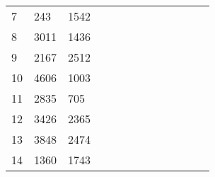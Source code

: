 \begin{table}[tb]
\begin{tabular}{|l|l|l|llllllllll}
		7  & 243  & 1542 &                           &                           &                           &                           &                           &                           &                           &                           &                           &                           \\ \cline{1-3}
		8  & 3011 & 1436 &                           &                           &                           &                           &                           &                           &                           &                           &                           &                           \\ \cline{1-3}
		9  & 2167 & 2512 &                           &                           &                           &                           &                           &                           &                           &                           &                           &                           \\ \cline{1-3}
		10 & 4606 & 1003 &                           &                           &                           &                           &                           &                           &                           &                           &                           &                           \\ \cline{1-3}
		11 & 2835 & 705  &                           &                           &                           &                           &                           &                           &                           &                           &                           &                           \\ \cline{1-3}
		12 & 3426 & 2365 &                           &                           &                           &                           &                           &                           &                           &                           &                           &                           \\ \cline{1-3}
		13 & 3848 & 2474 &                           &                           &                           &                           &                           &                           &                           &                           &                           &                           \\ \cline{1-3}
		14 & 1360 & 1743 &                           &                           &                           &                           &                           &                           &                           &                           &                           &                           \\ \cline{1-3}

\end{tabular}
\end{table}
